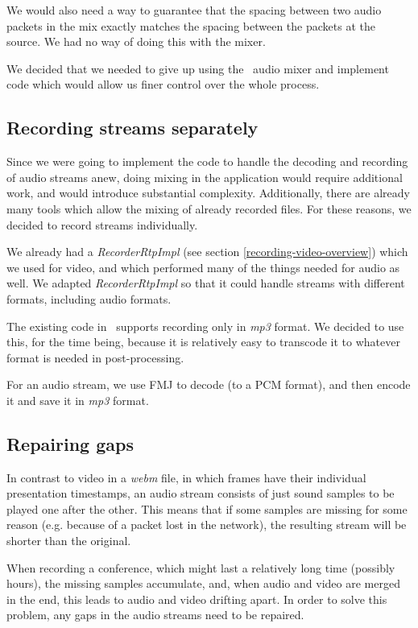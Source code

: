 \documentclass[twoside,openright,a4paper,12pt,english]{article}
\begin{document}
We would also need a way to guarantee that the spacing between two audio
packets in the mix exactly matches the spacing between the packets at the
source. We had no way of doing this with the mixer.

We decided that we needed to give up using the \lj\ audio mixer and
implement code which would allow us finer control over the whole process.


\subsection{Recording streams separately}
Since we were going to implement the code to handle the decoding and recording
of audio streams anew, doing mixing in the application would require additional
work, and would introduce substantial complexity. Additionally, there are already
many tools which allow the mixing of already recorded files. For these reasons, we
decided to record streams individually.

We already had a \emph{RecorderRtpImpl} (see section
\ref{recording-video-overview}) which we used for video, and which performed
many of the things needed for audio as well. We adapted \emph{RecorderRtpImpl}
so that it could handle streams with different formats, including audio
formats.

The existing code in \lj\ supports recording only in
\emph{mp3} format. We decided to use this, for the time being, because it is
relatively easy to transcode it to whatever format is needed in post-processing.

For an audio stream, we use FMJ to decode (to a PCM format), and
then encode it and save it in \emph{mp3} format.



\subsection{Repairing gaps}
In contrast to video in a \emph{webm} file, in which frames have their
individual presentation timestamps, an audio stream consists of just sound
samples to be played one after the other. This means that if some samples are missing
for some reason (e.g. because of a packet lost in the network), the resulting
stream will be shorter than the original. 

When recording a conference, which might last a relatively long time (possibly
hours), the missing samples accumulate, and, when audio and video are merged in
the end, this leads to audio and video drifting apart. In order to solve this
problem, any gaps in the audio streams need to be repaired. 
\end{document}
